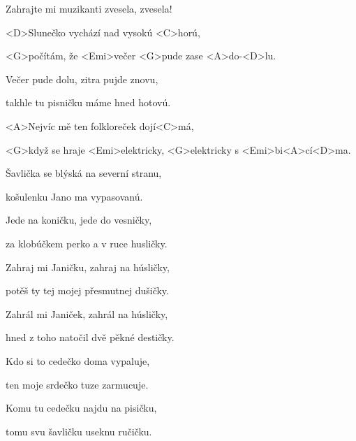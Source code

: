 

Zahrajte mi muzikanti zvesela, zvesela!

\zs
<D>Slunečko vychází nad vysokú <C>horú,

<G>počítám, že <Emi>večer <G>pude zase <A>do-<D>lu.

Večer pude dolu, zitra pujde znovu,

takhle tu pisničku máme hned hotovú.
\ks

\zr
<A>Nejvíc mě ten folkloreček dojí<C>má,

<G>když se hraje <Emi>elektricky, <G>elektricky s <Emi>bi<A>cí<D>ma.
\kr

\zs
Šavlička se blýská na severní stranu,

košulenku Jano ma vypasovanú.

Jede na koničku, jede do vesničky,

za klobúčkem perko a v ruce husličky.
\ks

\zr \kr

\zs
Zahraj mi Janičku, zahraj na húsličky,

potěš ty tej mojej přesmutnej dušičky.

Zahrál mi Janiček, zahrál na húsličky,

hned z toho natočil dvě pěkné destičky.

\ks

\zr \kr

\zs
Kdo si to cedečko doma vypaluje,

ten moje srdečko tuze zarmucuje.

Komu tu cedečku najdu na pisičku,

tomu svu šavličku useknu ručičku.
\ks

\zr \kr

\kp

